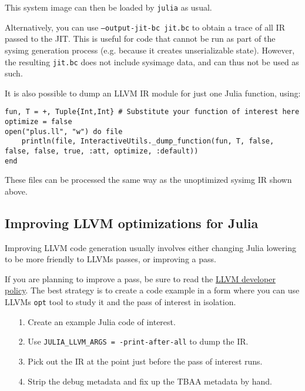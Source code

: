 This system image can then be loaded by \texttt{julia} as usual.



Alternatively, you can use \texttt{--output-jit-bc jit.bc} to obtain a trace of all IR passed to the JIT. This is useful for code that cannot be run as part of the sysimg generation process (e.g. because it creates unserializable state). However, the resulting \texttt{jit.bc} does not include sysimage data, and can thus not be used as such.



It is also possible to dump an LLVM IR module for just one Julia function, using:




\begin{verbatim}
fun, T = +, Tuple{Int,Int} # Substitute your function of interest here
optimize = false
open("plus.ll", "w") do file
    println(file, InteractiveUtils._dump_function(fun, T, false, false, false, true, :att, optimize, :default))
end
\end{verbatim}



These files can be processed the same way as the unoptimized sysimg IR shown above.



\hypertarget{18346154193244616171}{}


\subsection{Improving LLVM optimizations for Julia}



Improving LLVM code generation usually involves either changing Julia lowering to be more friendly to LLVM{\textquotesingle}s passes, or improving a pass.



If you are planning to improve a pass, be sure to read the \href{http://llvm.org/docs/DeveloperPolicy.html}{LLVM developer policy}. The best strategy is to create a code example in a form where you can use LLVM{\textquotesingle}s \texttt{opt} tool to study it and the pass of interest in isolation.



\begin{itemize}
\item[1. ] Create an example Julia code of interest.


\item[2. ] Use \texttt{JULIA\_LLVM\_ARGS = -print-after-all} to dump the IR.


\item[3. ] Pick out the IR at the point just before the pass of interest runs.


\item[4. ] Strip the debug metadata and fix up the TBAA metadata by hand.

\end{itemize}


